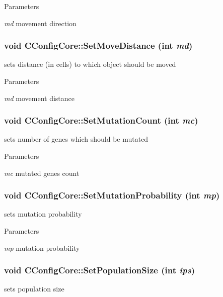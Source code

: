 \begin{DoxyParams}{Parameters}
\item[{\em md}]movement direction \end{DoxyParams}
\hypertarget{classCConfigCore_a5d89f16000290f977b9bf33cb9f5f0ca}{
\subsubsection[{SetMoveDistance}]{\setlength{\rightskip}{0pt plus 5cm}void CConfigCore::SetMoveDistance (int {\em md})}}
\label{classCConfigCore_a5d89f16000290f977b9bf33cb9f5f0ca}
sets distance (in cells) to which object should be moved


\begin{DoxyParams}{Parameters}
\item[{\em md}]movement distance \end{DoxyParams}
\hypertarget{classCConfigCore_affbb49b26e110a803d9a2a51e14e2a92}{
\subsubsection[{SetMutationCount}]{\setlength{\rightskip}{0pt plus 5cm}void CConfigCore::SetMutationCount (int {\em mc})}}
\label{classCConfigCore_affbb49b26e110a803d9a2a51e14e2a92}
sets number of genes which should be mutated


\begin{DoxyParams}{Parameters}
\item[{\em mc}]mutated genes count \end{DoxyParams}
\hypertarget{classCConfigCore_ab71c04aaf5d5ac97aaa95dde5979e554}{
\subsubsection[{SetMutationProbability}]{\setlength{\rightskip}{0pt plus 5cm}void CConfigCore::SetMutationProbability (int {\em mp})}}
\label{classCConfigCore_ab71c04aaf5d5ac97aaa95dde5979e554}
sets mutation probability


\begin{DoxyParams}{Parameters}
\item[{\em mp}]mutation probability \end{DoxyParams}
\hypertarget{classCConfigCore_a5d50ba80b386aa335876254b488911d9}{
\subsubsection[{SetPopulationSize}]{\setlength{\rightskip}{0pt plus 5cm}void CConfigCore::SetPopulationSize (int {\em ips})}}
\label{classCConfigCore_a5d50ba80b386aa335876254b488911d9}
sets population size


